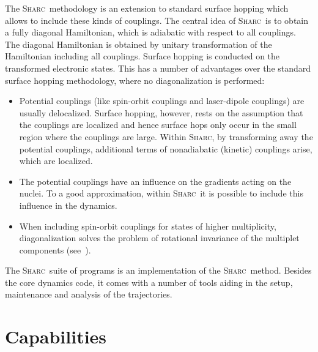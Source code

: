 \documentclass[a4paper,10pt,DIV=15,openany]{scrbook}
\newcommand{\sharc}{\textsc{Sharc}}
\begin{document}
The \sharc\ methodology is an extension to standard surface hopping which allows to include these kinds of couplings. The central idea of \sharc\ is to obtain a fully diagonal Hamiltonian, which is adiabatic with respect to all couplings. The diagonal Hamiltonian is obtained by unitary transformation of the Hamiltonian including all couplings. Surface hopping is conducted on the transformed electronic states.
This has a number of advantages over the standard surface hopping methodology, where no diagonalization is performed:
\begin{itemize}
  \item Potential couplings (like spin-orbit couplings and laser-dipole couplings) are usually delocalized. Surface hopping, however, rests on the assumption that the couplings are localized and hence surface hops only occur in the small region where the couplings are large. Within \sharc, by transforming away the potential couplings, additional terms of nonadiabatic (kinetic) couplings arise, which are localized. 
  \item The potential couplings have an influence on the gradients acting on the nuclei. To a good approximation, within \sharc\ it is possible to include this influence in the dynamics.
  \item When including spin-orbit couplings for states of higher multiplicity, diagonalization solves the problem of rotational invariance of the multiplet components (see~\cite{Granucci2012JCP}). 
\end{itemize}

The \sharc\ suite of programs is an implementation of the \sharc\ method. Besides the core dynamics code, it comes with a number of tools aiding in the setup, maintenance and analysis of the trajectories. 

\section{Capabilities}
\end{document}

